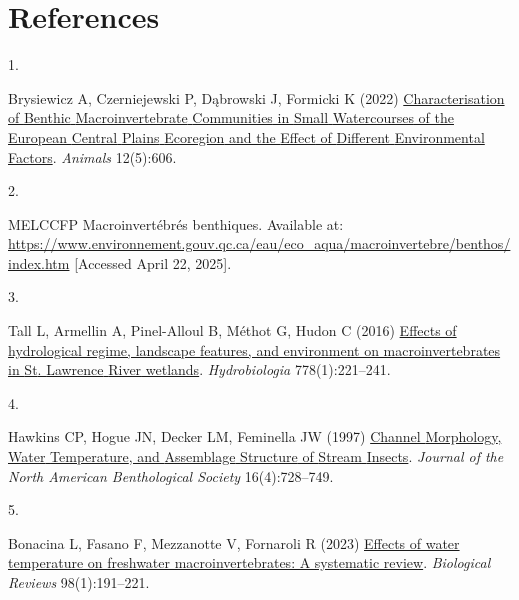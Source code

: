 \documentclass[9pt,twocolumn,twoside,]{pnas-new}
\newlength{\cslhangindent}
\newlength{\csllabelwidth}
\newenvironment{CSLReferences}[2] %
 {\begin{list}{}{%
  \setlength{\itemindent}{0pt}
  \setlength{\leftmargin}{0pt}
  \setlength{\parsep}{0pt}
  \ifodd #1
   \setlength{\leftmargin}{\cslhangindent}
   \setlength{\itemindent}{-1\cslhangindent}
  \fi
  \setlength{\itemsep}{#2\baselineskip}}}
 {\end{list}}
\newcommand{\CSLLeftMargin}[1]{\parbox[t]{\csllabelwidth}{#1}}
\newcommand{\CSLRightInline}[1]{\parbox[t]{\linewidth - \csllabelwidth}{#1}\break}
\begin{document}
\section*{References}\label{references}

\showmatmethods
\showacknow
\pnasbreak

\label{refs}
\begin{CSLReferences}{0}{1}
\CSLLeftMargin{1. }%
\CSLRightInline{Brysiewicz A, Czerniejewski P, Dąbrowski J, Formicki K
(2022) \href{https://doi.org/10.3390/ani12050606}{Characterisation of
{Benthic} {Macroinvertebrate} {Communities} in {Small} {Watercourses} of
the {European} {Central} {Plains} {Ecoregion} and the {Effect} of
{Different} {Environmental} {Factors}}. \emph{Animals} 12(5):606.}

\CSLLeftMargin{2. }%
\CSLRightInline{MELCCFP Macroinvertébrés benthiques. Available at:
\url{https://www.environnement.gouv.qc.ca/eau/eco_aqua/macroinvertebre/benthos/index.htm}
{[}Accessed April 22, 2025{]}.}

\CSLLeftMargin{3. }%
\CSLRightInline{Tall L, Armellin A, Pinel-Alloul B, Méthot G, Hudon C
(2016) \href{https://doi.org/10.1007/s10750-015-2531-7}{Effects of
hydrological regime, landscape features, and environment on
macroinvertebrates in {St}. {Lawrence} {River} wetlands}.
\emph{Hydrobiologia} 778(1):221--241.}

\CSLLeftMargin{4. }%
\CSLRightInline{Hawkins CP, Hogue JN, Decker LM, Feminella JW (1997)
\href{https://doi.org/10.2307/1468167}{Channel {Morphology}, {Water}
{Temperature}, and {Assemblage} {Structure} of {Stream} {Insects}}.
\emph{Journal of the North American Benthological Society}
16(4):728--749.}

\CSLLeftMargin{5. }%
\CSLRightInline{Bonacina L, Fasano F, Mezzanotte V, Fornaroli R (2023)
\href{https://doi.org/10.1111/brv.12903}{Effects of water temperature on
freshwater macroinvertebrates: A systematic review}. \emph{Biological
Reviews} 98(1):191--221.}

\end{CSLReferences}



% 
\end{document}
